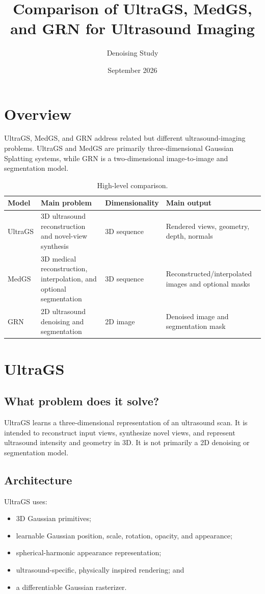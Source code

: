 \documentclass[11pt,a4paper]{article}
\title{Comparison of UltraGS, MedGS, and GRN for Ultrasound Imaging}
\author{Denoising Study}
\date{September 2026}
\begin{document}
\maketitle
\tableofcontents
\newpage

\section{Overview}

UltraGS, MedGS, and GRN address related but different ultrasound-imaging problems. UltraGS and MedGS are primarily three-dimensional Gaussian Splatting systems, while GRN is a two-dimensional image-to-image and segmentation model.

\begin{table}[h]
\centering
\caption{High-level comparison.}
\begin{tabular}{p{} p{} p{} p{}}
\toprule
Model & Main problem & Dimensionality & Main output \\
\midrule
UltraGS & 3D ultrasound reconstruction and novel-view synthesis & 3D sequence & Rendered views, geometry, depth, normals \\
MedGS & 3D medical reconstruction, interpolation, and optional segmentation & 3D sequence & Reconstructed/interpolated images and optional masks \\
GRN & 2D ultrasound denoising and segmentation & 2D image & Denoised image and segmentation mask \\
\bottomrule
\end{tabular}
\end{table}

\section{UltraGS}

\subsection{What problem does it solve?}
UltraGS learns a three-dimensional representation of an ultrasound scan. It is intended to reconstruct input views, synthesize novel views, and represent ultrasound intensity and geometry in 3D. It is not primarily a 2D denoising or segmentation model.

\subsection{Architecture}
UltraGS uses:
\begin{itemize}
    \item 3D Gaussian primitives;
    \item learnable Gaussian position, scale, rotation, opacity, and appearance;
    \item spherical-harmonic appearance representation;
    \item ultrasound-specific, physically inspired rendering; and
    \item a differentiable Gaussian rasterizer.
\end{itemize}
\end{document}

